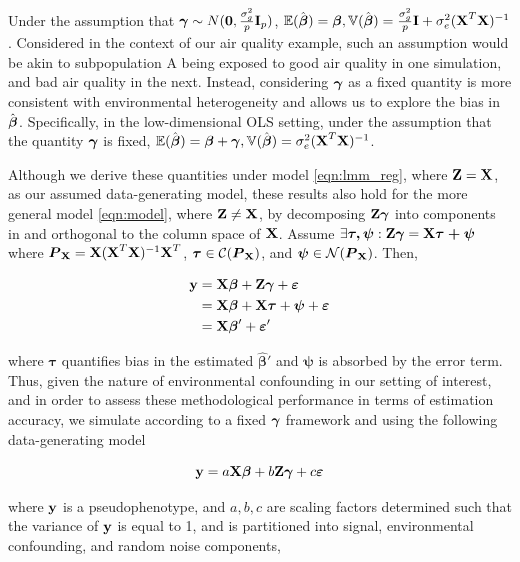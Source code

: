 Under the assumption that $\boldsymbol{\gamma} \sim N(\boldsymbol{0}, \frac{\sigma^2_g}{p} \textbf{I}_p)$, $\mathbb{E}(\hat{\boldsymbol{\beta}}) = \boldsymbol{\beta}, \mathbb{V}(\hat{\boldsymbol{\beta}}) = \frac{\sigma^2_g}{p}\textbf{I} + \sigma^2_e (\textbf{X}^T \textbf{X})^{-1}$. Considered in the context of our air quality example, such an assumption would be akin to subpopulation A being exposed to good air quality in one simulation, and bad air quality in the next. Instead, considering $\boldsymbol{\gamma}$ as a fixed quantity is more consistent with environmental heterogeneity and allows us to explore the bias in $\hat{\boldsymbol{\beta}}$. Specifically, in the low-dimensional OLS setting, under the assumption that the quantity $\boldsymbol{\gamma}$ is fixed, $\mathbb{E}(\hat{\boldsymbol{\beta}}) = \boldsymbol{\beta} + \boldsymbol{\gamma}, \mathbb{V}(\hat{\boldsymbol{\beta}}) = \sigma^2_e (\textbf{X}^T \textbf{X})^{-1}$. 

Although we derive these quantities under model \ref{eqn:lmm_reg}, where $\textbf{Z} = \textbf{X}$, as our assumed data-generating model, these results also hold for the more general model \ref{eqn:model}, where $\textbf{Z} \ne \textbf{X}$, by decomposing $\textbf{Z} \boldsymbol{\gamma}$ into components in and orthogonal to the column space of $\textbf{X}$. Assume $\exists \boldsymbol{\tau, \psi}: \textbf{Z} \boldsymbol{\gamma} = \textbf{X} \boldsymbol{\tau + \psi}$ where $\boldsymbol{P}_{\textbf{X}} = \textbf{X} (\textbf{X}^T \textbf{X})^{-1} \textbf{X}^T$, $\boldsymbol{\tau} \in \mathcal{C}(\boldsymbol{P}_{\textbf{X}})$, and $\boldsymbol{\psi} \in \mathcal{N}(\boldsymbol{P}_{\textbf{X}})$. Then,

\begin{align*}
    \textbf{y} &= \textbf{X}\boldsymbol{\beta} + \textbf{Z}\boldsymbol{\gamma} + \boldsymbol{\varepsilon}\\
    &= \textbf{X}\boldsymbol{\beta} + \textbf{X} \boldsymbol{\tau} + \boldsymbol{\psi} + \boldsymbol{\varepsilon}\\
    &=  \textbf{X} \boldsymbol{\beta}' + \boldsymbol{\varepsilon}'
\end{align*}

where $\boldsymbol{\tau}$ quantifies bias in the estimated $\boldsymbol{\hat{\beta}'}$ and $\boldsymbol{\psi}$ is absorbed by the error term. Thus, given the nature of environmental confounding in our setting of interest, and in order to assess these methodological performance in terms of estimation accuracy, we simulate according to a fixed $\boldsymbol{\gamma}$ framework and using the following data-generating model

\begin{equation}
    \label{eqn:sim}
    \textbf{y} = a \textbf{X} \boldsymbol{\beta} + b \textbf{Z} \boldsymbol{\gamma} + c \boldsymbol{\varepsilon} 
\end{equation}

where $\textbf{y}$ is a pseudophenotype, and $a, b, c$ are scaling factors determined such that the variance of $\textbf{y}$ is equal to 1, and is partitioned into signal, environmental confounding, and random noise components,

